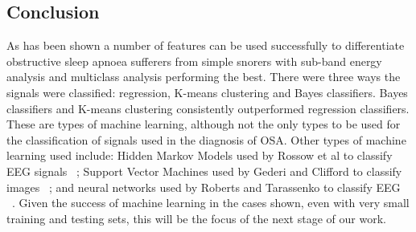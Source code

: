 \subsection{Conclusion}
As has been shown a number of features can be used successfully to differentiate obstructive sleep apnoea sufferers from simple snorers with sub-band energy analysis and multiclass analysis performing the best. There were three ways the signals were classified: regression, K-means clustering and Bayes classifiers. Bayes classifiers and K-means clustering consistently outperformed regression classifiers. These are types of machine learning, although not the only types to be used for the classification of signals used in the diagnosis of OSA. Other types of machine learning used include: Hidden Markov Models used by Rossow et al to classify EEG signals ~\cite{rossow2011automatic}; Support Vector Machines used by Gederi and Clifford to classify images ~\cite{gederi2012fusion}; and neural networks used by Roberts and Tarassenko to classify EEG ~\cite{roberts1992new}. Given the success of machine learning in the cases shown, even with very small training and testing sets, this will be the focus of the next stage of our work. 

